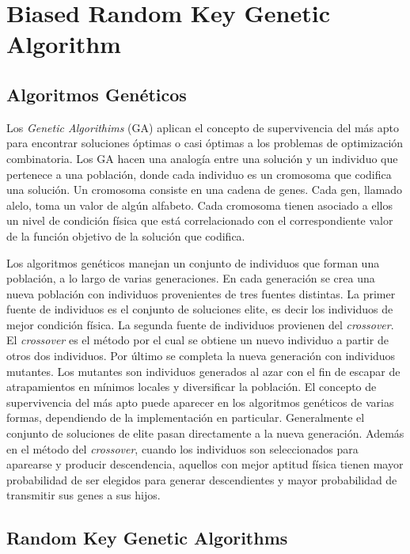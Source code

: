 
\chapter{Biased Random Key Genetic Algorithm}

\section{Algoritmos Genéticos}

Los \textit{Genetic Algorithims} (GA) \cite{Goldberg} aplican el concepto de supervivencia del más apto para encontrar soluciones óptimas o casi óptimas a los problemas de optimización combinatoria. Los GA hacen una analogía entre una solución y un individuo que pertenece a una población, donde cada individuo es un cromosoma que codifica una solución. Un cromosoma consiste en una cadena de genes. Cada gen, llamado alelo, toma un valor de algún alfabeto. Cada cromosoma tienen asociado a ellos un nivel de condición física que está correlacionado con el correspondiente valor de la función objetivo de la solución que codifica. 

\bigskip

Los algoritmos genéticos manejan un conjunto de individuos que forman una población, a lo largo de varias generaciones. En cada generación se crea una nueva población con individuos provenientes de tres fuentes distintas. La primer fuente de individuos es el conjunto de soluciones elite, es decir los individuos de mejor condición física. La segunda fuente de individuos provienen del \textit{crossover}. El \textit{crossover} es el método por el cual se obtiene un nuevo individuo a partir de otros dos individuos. Por último se completa la nueva generación con individuos mutantes. Los mutantes son individuos generados al azar con el fin de escapar de atrapamientos en mínimos locales y diversificar la población. El concepto de supervivencia del más apto puede aparecer en los algoritmos genéticos de varias formas, dependiendo de la implementación en particular. Generalmente el conjunto de soluciones de elite pasan directamente a la nueva generación. Además en el método del \textit{crossover}, cuando los individuos son seleccionados para aparearse y producir descendencia, aquellos con mejor aptitud física tienen mayor probabilidad de ser elegidos para generar descendientes y mayor probabilidad de transmitir sus genes a sus hijos.

\section{Random Key Genetic Algorithms}

